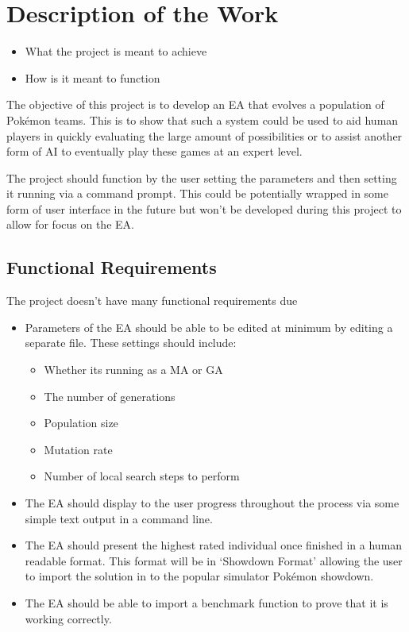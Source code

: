 \documentclass[a4paper]{article}
\newcommand{\Pokemon}{Pok\'{e}mon}
\begin{document}
\section{Description of the Work}
\begin{itemize}
    \item What the project is meant to achieve
	\item How is it meant to function
\end{itemize}
\par
The objective of this project is to develop an EA that evolves a population of \Pokemon{} teams.
This is to show that such a system could be used to aid human players in quickly evaluating the large amount of possibilities or to assist another form of AI to eventually play these games at an expert level.
\par
The project should function by the user setting the parameters and then setting it running via a command prompt.
This could be potentially wrapped in some form of user interface in the future but won't be developed during this project to allow for focus on the EA\@.
\subsection{Functional Requirements}
The project doesn't have many functional requirements due
\begin{itemize}
	\item Parameters of the EA should be able to be edited at minimum by editing a separate file. These settings should include:
	\begin{itemize}
		\item Whether its running as a MA or GA
		\item The number of generations
		\item Population size
		\item Mutation rate
		\item Number of local search steps to perform
	\end{itemize}
	\item The EA should display to the user progress throughout the process via some simple text output in a command line.
	\item The EA should present the highest rated individual once finished in a human readable format. This format will be in `Showdown Format' allowing the user to import the solution in to the popular simulator \Pokemon{} showdown.
	\item The EA should be able to import a benchmark function to prove that it is working correctly.
\end{itemize}
\end{document}
